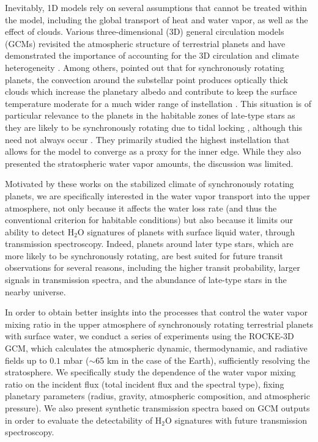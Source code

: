 \documentclass[11pt,numberedappendix,twocolappendix,]{emulateapj}
\def\water{H$_2$O}
\def\modelE{ROCKE-3D}
\def\wv{water vapor}
\begin{document}
Inevitably, 1D models rely on several assumptions that cannot be treated within the model, including the global transport of heat and water vapor, as well as the effect of clouds. 
Various three-dimensional (3D) general circulation models (GCMs) revisited the atmospheric structure of terrestrial planets and have demonstrated the importance of accounting for the 3D circulation and climate heterogeneity \citep[e.g.][]{Ishiwatari2002,Abe2011,Leconte2013a,Leconte2013b,Wolf2014,Wolf2015}. 
Among others, \citet{Yang2013} pointed out that for synchronously rotating planets, the convection around the substellar point produces optically thick clouds which increase the planetary albedo and contribute to keep the surface temperature moderate for a much wider range of instellation \citep[see also][]{Yang2014,Way2015,Kopparapu2016}. 
This situation is of particular relevance to the planets in the habitable zones of late-type stars as they are likely to be synchronously rotating due to tidal locking \citep{Dole1964, Kasting1993}, although this need not always occur \citep{Goldreich1966,Leconte2015}. 
They primarily studied the highest instellation that allows for the model to converge as a proxy for the inner edge. 
While they also presented the stratospheric water vapor amounts, the discussion was limited. 

Motivated by these works on the stabilized climate of synchronously rotating planets, we are specifically interested in the \wv{} transport into the upper atmosphere, not only because it affects the water loss rate (and thus the conventional criterion for habitable conditions) but also because it limits our ability to detect \water{} signatures of planets with surface liquid water, through transmission spectroscopy. 
%
Indeed, planets around later type stars, which are more likely to be synchronously rotating, are best suited for future transit observations for several reasons, including the higher transit probability, larger signals in transmission spectra, and the abundance of late-type stars in the nearby universe. 

In order to obtain better insights into the processes that control the \wv{}  mixing ratio in the upper atmosphere of synchronously rotating terrestrial planets with surface water, we conduct a series of experiments using the \modelE{} GCM, which calculates the atmospheric dynamic, thermodynamic, and radiative fields up to $0.1$ mbar ($\sim $65 km in the case of the Earth), sufficiently resolving the stratosphere. 
We specifically study the dependence of the \wv{} mixing ratio on the incident flux (total incident flux and the spectral type), fixing planetary parameters (radius, gravity, atmospheric composition, and atmospheric pressure). 
We also present synthetic transmission spectra based on GCM outputs in order to evaluate the detectability of \water{} signatures with future transmission spectroscopy. 
\end{document}
